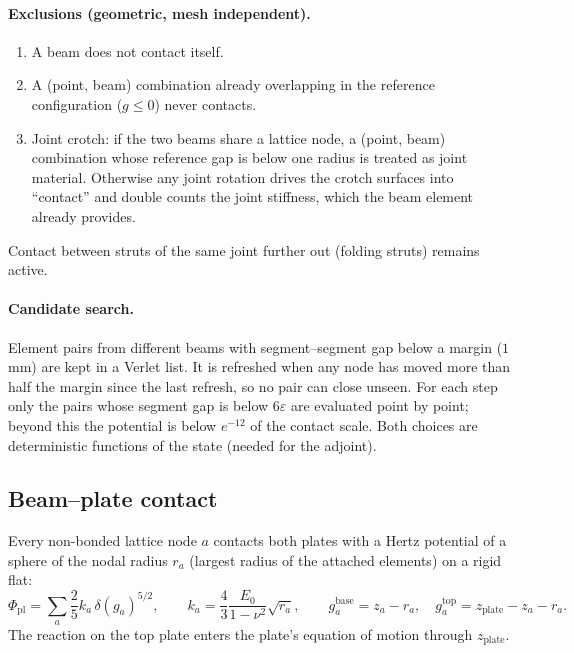 \documentclass[11pt,a4paper]{article}
\begin{document}
\paragraph{Exclusions (geometric, mesh independent).}
\begin{enumerate}
\item A beam does not contact itself.
\item A (point, beam) combination already overlapping in the reference configuration ($g\le0$) never contacts.
\item Joint crotch: if the two beams share a lattice node, a (point, beam) combination whose reference gap is
below one radius is treated as joint material. Otherwise any joint rotation drives the crotch surfaces into
``contact'' and double counts the joint stiffness, which the beam element already provides.
\end{enumerate}
Contact between struts of the same joint further out (folding struts) remains active.

\paragraph{Candidate search.} Element pairs from different beams with segment--segment gap below a margin
($1$\,mm) are kept in a Verlet list. It is refreshed when any node has moved more than half the margin since
the last refresh, so no pair can close unseen. For each step only the pairs whose segment gap is below
$6\varepsilon$ are evaluated point by point; beyond this the potential is below $e^{-12}$ of the contact
scale. Both choices are deterministic functions of the state (needed for the adjoint).

\subsection{Beam--plate contact}
Every non-bonded lattice node $a$ contacts both plates with a Hertz potential of a sphere of the nodal radius
$r_a$ (largest radius of the attached elements) on a rigid flat:
\begin{equation}
\Phi_\mathrm{pl} = \sum_{a} \frac{2}{5}k_a\,\delta(g_a)^{5/2},\qquad k_a = \frac43\frac{E_0}{1-\nu^2}\sqrt{r_a},
\qquad g_a^\mathrm{base} = z_a - r_a,\quad g_a^\mathrm{top} = z_\mathrm{plate} - z_a - r_a .
\end{equation}
The reaction on the top plate enters the plate's equation of motion through $z_\mathrm{plate}$.
\end{document}
